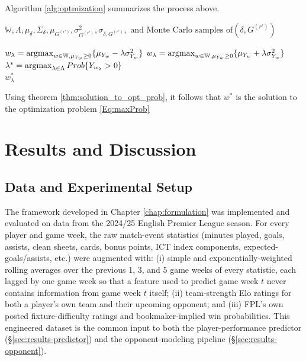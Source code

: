 					Algorithm \ref{alg:optmization} summarizes the process above.


					\begin{algorithm}
						\caption{Optimization for the Problem }
						\label{alg:optmization}
						\begin{algorithmic}[1]
							\Require $\mathbb{W}, \Lambda, \mu_\delta, \Sigma_{\delta}, \mu_{G^(r')}, \sigma^2_{G^(r')}, \sigma_{\delta, G^{(r')}}, \text{ and Monte Carlo samples of} (\delta, G^{(r')})$

							\ForAll{ $\lambda \in  \Lambda$}
							\State $w_\lambda = \operatorname*{argmax}_{w \in \mathbb{W}, \mu_{Y_w} \ge 0 } \{\mu_{Y_w} - \lambda\sigma^2_{Y_w}\}$
							\EndFor
							\Else
							\ForAll{ $\lambda \in  \Lambda$}
							\State $w_\lambda = \operatorname*{argmax}_{w \in \mathbb{W}, \mu_{Y_w} \ge 0 } \{\mu_{Y_w} + \lambda\sigma^2_{Y_w}\}$
							\EndFor
							\EndIf
							\State  $\lambda^* = \operatorname*{argmax}_{ \lambda \in \Lambda } Prob\{Y_{w_\lambda} > 0 \}$\\
							\Return $w_\lambda^*$
						\end{algorithmic}
					\end{algorithm}
			Using theorem \ref{thm:solution_to_opt_prob}, it follows that $w^*$ is the solution to the optimization problem \ref{Eq:maxProb}

	\chapter{Results and Discussion}

		\section{Data and Experimental Setup}
			The framework developed in Chapter \ref{chap:formulation} was implemented and evaluated on data from the 2024/25 English Premier League season. For every player and game week, the raw match-event statistics (minutes played, goals, assists, clean sheets, cards, bonus points, ICT index components, expected-goals/assists, etc.) were augmented with: (i) simple and exponentially-weighted rolling averages over the previous 1, 3, and 5 game weeks of every statistic, each lagged by one game week so that a feature used to predict game week $t$ never contains information from game week $t$ itself; (ii) team-strength Elo ratings for both a player's own team and their upcoming opponent; and (iii) FPL's own posted fixture-difficulty ratings and bookmaker-implied win probabilities. This engineered dataset is the common input to both the player-performance predictor (\S\ref{sec:results-predictor}) and the opponent-modeling pipeline (\S\ref{sec:results-opponent}).

